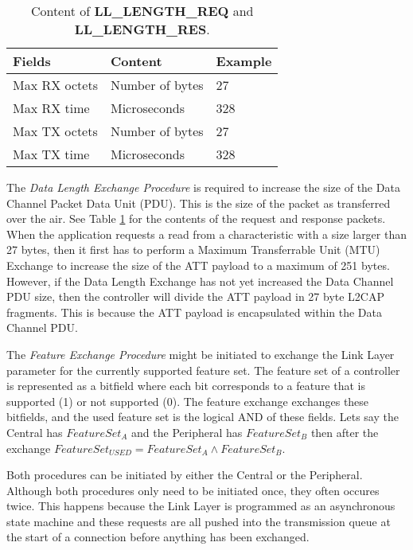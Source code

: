 \begin{table}
    \begin{center}
    \begin{tabular}{|l|l|l|}
        \hline
        \textbf{Fields} & \textbf{Content} & \textbf{Example} \\
        \hline
        Max RX octets & Number of bytes & 27 \\
        \hline
        Max RX time & Microseconds & 328 \\
        \hline
        Max TX octets & Number of bytes & 27 \\
        \hline
        Max TX time & Microseconds & 328 \\
        \hline
    \end{tabular}
    \end{center}
    \caption{Content of \textbf{LL\_LENGTH\_REQ} and \textbf{LL\_LENGTH\_RES}.}
    \label{tbl:dle_packet_content}
\end{table}

The \textit{Data Length Exchange Procedure} is required to increase the size of the Data Channel Packet Data Unit (PDU). This is the size of the packet as transferred over the air. See Table \ref{tbl:dle_packet_content} for the contents of the request and response packets. When the application requests a read from a characteristic with a size larger than 27 bytes, then it first has to perform a Maximum Transferrable Unit (MTU) Exchange to increase the size of the ATT payload to a maximum of 251 bytes. However, if the Data Length Exchange has not yet increased the Data Channel PDU size, then the controller will divide the ATT payload in 27 byte L2CAP fragments. This is because the ATT payload is encapsulated within the Data Channel PDU.

The \textit{Feature Exchange Procedure} might be initiated to exchange the Link Layer parameter for the currently supported feature set. The feature set of a controller is represented as a bitfield where each bit corresponds to a feature that is supported (1) or not supported (0). The feature exchange exchanges these bitfields, and the used feature set is the logical AND of these fields. Lets say the Central has $FeatureSet_A$ and the Peripheral has $FeatureSet_B$ then after the exchange $FeatureSet_{USED} = FeatureSet_A \land FeatureSet_B$.

Both procedures can be initiated by either the Central or the Peripheral. Although both procedures only need to be initiated once, they often occures twice. This happens because the Link Layer is programmed as an asynchronous state machine and these requests are all pushed into the transmission queue at the start of a connection before anything has been exchanged.

